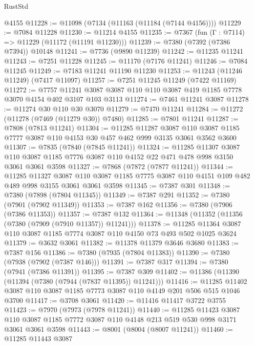 \begin{lexlean}{RustStd}
\begin{coremodule}
    @4155
@11228 := @11098 (@7134 (@11163 (@11184 (@7144 @4156))))
@11229 := @7084 @11228
@11230 := @11214 @4155
@11235 := @7367 (fun (Γ : @7114) => @11229 (@11172 (@11191 @11230)))
@11239 := @7380 (@7392 (@7386 @7394)) @10148
@11241 := @7736 (@9890 @11239)
@11242 := @11235 @11241
@11243 := @7251 @11228
@11245 := @11170 (@7176 @11241)
@11246 := @7084 @11245
@11249 := @7183 @11241 @11190 @11230
@11253 := @11243 (@11246 @11249) (@7417 @11097)
@11257 := @7251 @11245 @11249 (@7422 @11169)
@11272 := @7757
    @11241
    @3087
    @3087
    @110
    @110
    @3087
    @419
    @1185
    @7778
    @3070
    @4154
    @402
    @3107
    @103
    @3113
@11274 := @7461 @11241 @3087
@11278 := @11274 @30 @110 @30 @3070
@11279 := @7470 @11241
@11284 := @11272 (@11278 (@7469 (@11279 @30)) @7480)
@11285 := @7801 @11241
@11287 := @7808 (@7813 @11241)
@11304 := @11285
    @11287
    @3087
    @110
    @3087
    @1185
    @7777
    @3087
    @110
    @4153
    @30
    @457
    @462
    @999
    @3135
    @3061
    @3562
    @3600
@11307 := @7835 (@7840 (@7845 @11241))
@11324 := @11285
    @11307
    @3087
    @110
    @3087
    @1185
    @7776
    @3087
    @110
    @4152
    @22
    @471
    @478
    @998
    @3150
    @3061
    @3061
    @3598
@11327 := @7868 (@7872 (@7877 @11241))
@11344 := @11285
    @11327
    @3087
    @110
    @3087
    @1185
    @7775
    @3087
    @110
    @4151
    @109
    @482
    @489
    @998
    @3155
    @3061
    @3061
    @3598
@11345 := @7387 @301
@11348 := @7380 (@7898 (@7804 @11345))
@11349 := @7387 @291
@11352 := @7380 (@7901 (@7902 @11349))
@11353 := @7387 @162
@11356 := @7380 (@7906 (@7386 @11353))
@11357 := @7387 @132
@11364 := @11348 (@11352 (@11356 (@7380 (@7909 (@7910 @11357)) @11241)))
@11378 := @11285 @11364 @3087 @110 @3087 @1185 @7774 @3087 @110 @4150 @73 @493 @502 @1025 @3624
@11379 := @3632 @3061
@11382 := @11378 @11379 @3646 @3680
@11383 := @7387 @156
@11386 := @7380 (@7935 (@7804 @11383))
@11390 := @7380 (@7938 (@7902 (@7387 @146)))
@11391 := @7387 @317
@11394 := @7380 (@7941 (@7386 @11391))
@11395 := @7387 @309
@11402 := @11386 (@11390 (@11394 (@7380 (@7944 (@7837 @11395)) @11241)))
@11416 := @11285 @11402 @3087 @110 @3087 @1185 @7773 @3087 @110 @4149 @201 @506 @515 @1046 @3700
@11417 := @3708 @3061
@11420 := @11416 @11417 @3722 @3755
@11423 := @7970 (@7973 (@7978 @11241))
@11440 := @11285
    @11423
    @3087
    @110
    @3087
    @1185
    @7772
    @3087
    @110
    @4148
    @213
    @519
    @530
    @998
    @3171
    @3061
    @3061
    @3598
@11443 := @8001 (@8004 (@8007 @11241))
@11460 := @11285
    @11443
    @3087

\end{coremodule}
\end{lexlean}
